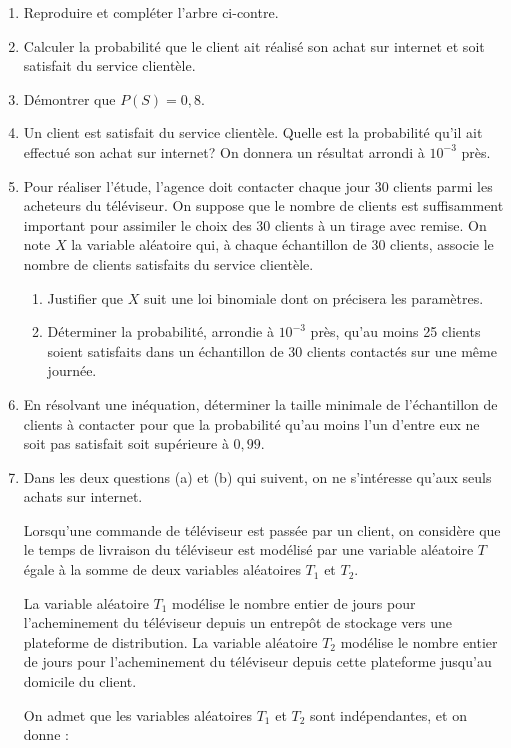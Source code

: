 \begin{enumerate}
	\item Reproduire et compléter l'arbre ci-contre.
	\item Calculer la probabilité que le client ait réalisé son achat sur internet et soit satisfait du service clientèle.
	\item Démontrer que $P(S)=0,8$.
	\item Un client est satisfait du service clientèle. Quelle est la probabilité qu'il ait effectué son achat sur internet? On donnera un résultat arrondi à $10^{-3}$ près.
	\item Pour réaliser l'étude, l'agence doit contacter chaque jour 30 clients parmi les acheteurs du téléviseur. On suppose que le nombre de clients est suffisamment important pour assimiler le choix des 30 clients à un tirage avec remise. On note $X$ la variable aléatoire qui, à chaque échantillon de 30 clients, associe le nombre de clients satisfaits du service clientèle.
	
	\begin{enumerate}
		\item Justifier que $X$ suit une loi binomiale dont on précisera les paramètres.
		\item Déterminer la probabilité, arrondie à $10^{-3}$ près, qu'au moins 25 clients soient satisfaits dans un échantillon de 30 clients contactés sur une même journée.
	\end{enumerate}
	\item En résolvant une inéquation, déterminer la taille minimale de l'échantillon de clients à contacter pour que la probabilité qu'au moins l'un d'entre eux ne soit pas satisfait soit supérieure à $0,99$.
	\item Dans les deux questions (a) et (b) qui suivent, on ne s'intéresse qu'aux seuls achats sur internet.
	
	Lorsqu'une commande de téléviseur est passée par un client, on considère que le temps de livraison du téléviseur est modélisé par une variable aléatoire $T$ égale à la somme de deux variables aléatoires $T_{1}$ et $T_{2}$.
	
	La variable aléatoire $T_{1}$ modélise le nombre entier de jours pour l'acheminement du téléviseur depuis un entrepôt de stockage vers une plateforme de distribution. La variable aléatoire $T_{2}$ modélise le nombre entier de jours pour l'acheminement du téléviseur depuis cette plateforme jusqu'au domicile du client.
	
	On admet que les variables aléatoires $T_{1}$ et $T_{2}$ sont indépendantes, et on donne :
	

\end{enumerate}
